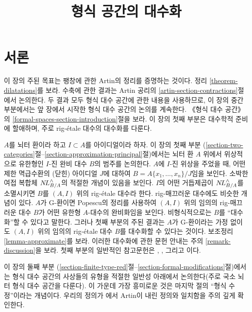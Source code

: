 

%


\title{형식 공간의 대수화}


\maketitle

\label{section-phantom}

\tableofcontents

\section{서론}
\label{section-introduction}

\noindent
이 장의 주된 목표는 팽창에 관한 Artin의 정리를 증명하는 것이다.
정리 \ref{theorem-dilatations}를 보라. 수축에 관한 결과는 Artin 공리의
\ref{artin-section-contractions}절에서 논의한다. 두 결과 모두 형식 대수 공간에
관한 내용을 사용하므로, 이 장의 중간 부분에서는 앞 장에서 시작한 형식 대수 공간의
논의를 계속한다. 《형식 대수 공간》의
\ref{formal-spaces-section-introduction}절을 보라. 이 장의 첫째 부분은 대수학적
준비에 할애하며, 주로 rig-\'etale 대수의 대수화를 다룬다.

\medskip\noindent
$A$를 뇌터 환이라 하고 $I \subset A$를 아이디얼이라 하자. 이 장의 첫째 부분
(\ref{section-two-categories}절--\ref{section-approximation-principal}절)에서는
뇌터 환 $A$ 위에서 위상적으로 유한형인 $I$-진 완비 대수 $B$의 범주를 논의한다.
$A$에 $I$-진 위상을 주었을 때, 어떤 제한 멱급수환의 (닫힌) 아이디얼 $J$에 대하여
$B = A\{x_1, \ldots, x_n\}/J$임을 보인다. 소박한 여접 복합체
$\mathop{N\!L}\nolimits_{B/A}^\wedge$의 적절한 개념이 있음을 보인다. $I$의 어떤 거듭제곱이
$\mathop{N\!L}\nolimits_{B/A}^\wedge$를 소멸시키면 $B$를 $(A, I)$ 위의 rig-\'etale 대수라 한다.
rig-매끄러운 대수에도 비슷한 개념이 있다. $A$가 G-환이면 Popescu의 정리를 사용하여
$(A, I)$ 위의 임의의 rig-매끄러운 대수 $B$가 어떤 유한형 $A$-대수의 완비화임을
보인다. 비형식적으로는 $B$를 ``대수화''할 수 있다고 말한다. 그러나 첫째 부분의
주된 결과는 $A$가 G-환이라는 가정 없이도 $(A, I)$ 위의 임의의 rig-\'etale 대수
$B$를 대수화할 수 있다는 것이다. 보조정리 \ref{lemma-approximate}를 보라. 이러한
대수화에 관한 문헌 안내는 주의 \ref{remark-discussion}을 보라. 첫째 부분의 일반적인
참고문헌은 \cite{EGA}, \cite{Abbes}, 그리고 \cite{Fujiwara-Kato}이다.

\medskip\noindent
이 장의 둘째 부분
(\ref{section-finite-type-red}절--\ref{section-formal-modifications}절)에서는
형식 대수 공간의 사상들의 유형을 적절한 일반성 아래에서 논의한다(주로 국소 뇌터
형식 대수 공간을 다룬다). 이 가운데 가장 흥미로운 것은 마지막 절의
``형식 수정''이라는 개념이다. 우리의 정의가 \cite{ArtinII}에서 Artin이 내린
정의와 일치함을 주의 깊게 확인한다.

